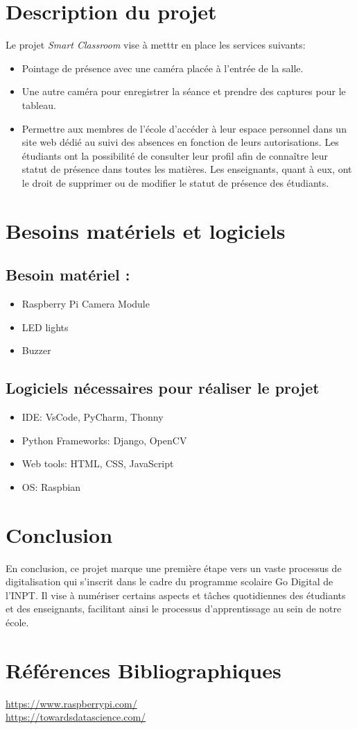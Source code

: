 \documentclass{article}
\begin{document}
	\section{Description du projet}
	Le projet \textit{Smart Classroom} vise à metttr en place les services suivants:
	\begin{itemize}
		\item Pointage de présence avec une caméra placée à l'entrée de la salle.
		\item Une autre caméra pour enregistrer la séance et prendre des captures pour le tableau.
		\item Permettre aux membres de l'école d'accéder à leur espace personnel dans un site web dédié au suivi des absences en fonction de leurs autorisations. Les étudiants ont la possibilité de consulter leur profil afin de connaître leur statut de présence dans toutes les matières. Les enseignants, quant à eux, ont le droit de supprimer ou de modifier le statut de présence des étudiants.
	\end{itemize}
	
	\section{Besoins matériels et logiciels}
	\subsection{Besoin matériel :}
	\begin{itemize}
		\item Raspberry Pi Camera Module
		\item LED lights
		\item Buzzer
	\end{itemize}
	
	\subsection{Logiciels nécessaires pour réaliser le projet}
	\begin{itemize}
		\item IDE: VsCode, PyCharm, Thonny
		\item Python Frameworks: Django, OpenCV
		\item Web tools: HTML, CSS, JavaScript
		\item OS: Raspbian
	\end{itemize}
	
	\section{Conclusion}
	En conclusion, ce projet marque une première étape vers un vaste processus de digitalisation qui s'inscrit dans le cadre du programme scolaire Go Digital de l’INPT. Il vise à numériser certains aspects et tâches quotidiennes des étudiants et des enseignants, facilitant ainsi le processus d'apprentissage au sein de notre école.
	
	\section{Références Bibliographiques}
	\href{https://www.raspberrypi.com/}{https://www.raspberrypi.com/}\\
	\href{https://towardsdatascience.com/real-time-face-recognition-an-end-to-end-project-b738bb0f7348}{https://towardsdatascience.com/}
	
\end{document}
